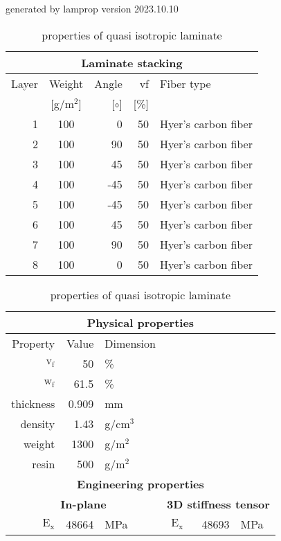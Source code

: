 \documentclass[a4paper,landscape,oneside,11pt,twocolumn]{memoir}
\begin{document}
\begin{table}[!htbp]
  \caption{\label{tab:quasi-isotropic-mat}properties of quasi isotropic laminate}
  \centering\footnotesize{\rule{0pt}{10pt}
  \tiny generated by lamprop version 2023.10.10\\[3pt]}
    \begin{tabular}[t]{rcrrl}
      \multicolumn{5}{c}{\small\textbf{Laminate stacking}}\\[0.1em]
      \toprule %
      Layer & Weight & Angle & vf & Fiber type\\
            & [g/m$^2$] & [$\circ$] & [\%]\\
      \midrule
      1 &  100 &     0 & 50 & Hyer's carbon fiber\\
      2 &  100 &    90 & 50 & Hyer's carbon fiber\\
      3 &  100 &    45 & 50 & Hyer's carbon fiber\\
      4 &  100 &   -45 & 50 & Hyer's carbon fiber\\
      5 &  100 &   -45 & 50 & Hyer's carbon fiber\\
      6 &  100 &    45 & 50 & Hyer's carbon fiber\\
      7 &  100 &    90 & 50 & Hyer's carbon fiber\\
      8 &  100 &     0 & 50 & Hyer's carbon fiber\\
      \bottomrule
    \end{tabular}\hspace{0.02\textwidth}
    \begin{tabular}[t]{rrlrrl}
      \multicolumn{6}{c}{\small\textbf{Physical properties}}\\[0.1em]
      \toprule
      Property & Value & Dimension\\
      \midrule
      $\mathrm{v_f}$ & 50 &\%\\
      $\mathrm{w_f}$ & 61.5 &\%\\
      thickness & 0.909 & mm\\
      density & 1.43 & g/cm$^3$\\
      weight & 1300 & g/m$^2$\\
      resin & 500 & g/m$^2$\\
      \midrule
      \multicolumn{6}{c}{\small\textbf{Engineering properties}}\\[0.1em]
      \multicolumn{3}{c}{\small\textbf{In-plane}} & 
\multicolumn{3}{c}{\small\textbf{3D stiffness tensor}}\\[0.1em]
      $\mathrm{E_x}$ &    48664 & MPa & $\mathrm{E_x}$ &    48693 & MPa\\

\end{tabular}
\end{table}
\end{document}
